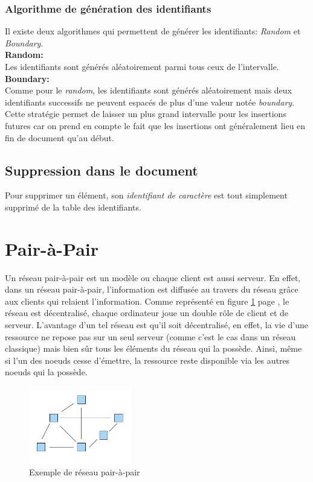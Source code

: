 		\subsubsection*{Algorithme de génération des
		identifiants}\label{sec:algos}
		Il existe deux algorithmes qui permettent de générer les identifiants:
		\emph{Random} et \emph{Boundary}.\\
		
		\textbf{Random:}\\
			Les identifiants sont générés aléatoirement parmi tous ceux de
			l'intervalle.\\
		
		\textbf{Boundary:}\\
			Comme pour le \emph{random}, les identifiants sont générés
			aléatoirement mais deux identifiants successifs ne peuvent espacés
			de plus d'une valeur notée \emph{boundary}. Cette stratégie permet
			de laisser un plus grand intervalle pour les insertions futures car on
			prend en compte le fait que les insertions ont généralement lieu en
			fin de document qu'au début.
		
	\subsection{Suppression dans le document}
		
		Pour supprimer un élément, son \emph{identifiant de caractère} est tout
		simplement supprimé de la table des identifiants.
		
\section{Pair-à-Pair}\label{sec:p2p}

	Un réseau pair-à-pair est un modèle ou chaque client est aussi serveur. En
	effet, dans un réseau pair-à-pair, l'information est diffusée au travers du
	réseau grâce aux clients qui relaient l'information. Comme représenté en
	figure \ref{fig:p2p} page \pageref{fig:p2p}, le réseau est décentralisé,
	chaque ordinateur joue un double rôle de client et de serveur. L'avantage
	d'un tel réseau est qu'il soit décentralisé, en effet, la vie d'une
	ressource ne repose pas sur un seul serveur (comme c'est le cas dans un
	réseau classique) mais bien sûr tous les éléments du réseau qui la possède.
	Ainsi, même si l'un des noeuds cesse d'émettre, la ressource reste
	disponible via les autres noeuds qui la possède.
	
	\begin{figure}
	  \center
      \includegraphics[width=0.4\textwidth]{includes/P2P-network.png}
      \caption{Exemple de réseau pair-à-pair}
      \label{fig:p2p}
    \end{figure}
	
